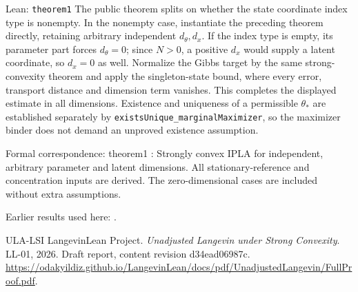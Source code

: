 \documentclass[11pt,a4paper]{article}
\begin{document}
\begin{leanbox}{Lean: \texttt{theorem1}}
The public theorem splits on whether the state coordinate index type is nonempty. In the nonempty case, instantiate the preceding theorem directly, retaining arbitrary independent \(d_\theta,d_x\). If the index type is empty, its parameter part forces \(d_\theta=0\); since \(N>0\), a positive \(d_x\) would supply a latent coordinate, so \(d_x=0\) as well. Normalize the Gibbs target by the same strong-convexity theorem and apply the singleton-state bound, where every error, transport distance and dimension term vanishes. This completes the displayed estimate in all dimensions. Existence and uniqueness of a permissible \(\theta_*\) are established separately by \texttt{exists\allowbreak{}Unique\_\allowbreak{}marginal\allowbreak{}Maximizer}, so the maximizer binder does not demand an unproved existence assumption.



Formal correspondence: theorem1 : Strongly convex IPLA for independent, arbitrary parameter and latent dimensions. All stationary-reference and concentration inputs are derived. The zero-dimensional cases are included without extra assumptions.
\end{leanbox}


Earlier results used here: \cite[Section~3.17.4]{LangevinLean2026ULASC}.

\begin{thebibliography}{ULA-LSI}
LangevinLean Project. \emph{Unadjusted Langevin under Strong Convexity}. LL-01, 2026. Draft report, content revision d34ead06987c. \url{https://odakyildiz.github.io/LangevinLean/docs/pdf/UnadjustedLangevin/FullProof.pdf}.
\end{thebibliography}
\end{document}
